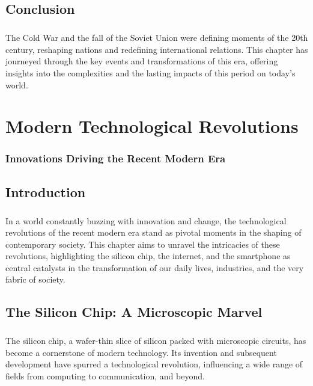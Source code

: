 \documentclass[a4paper,12pt]{book}
\begin{document}
\section*{Conclusion}
\paragraph{}
The Cold War and the fall of the Soviet Union were defining moments of the 20th century, reshaping nations and redefining international relations. This chapter has journeyed through the key events and transformations of this era, offering insights into the complexities and the lasting impacts of this period on today’s world.

\chapter{Modern Technological Revolutions}
\subsection*{Innovations Driving the Recent Modern Era}

\section*{Introduction}
\paragraph{}
In a world constantly buzzing with innovation and change, the technological revolutions of the recent modern era stand as pivotal moments in the shaping of contemporary society. This chapter aims to unravel the intricacies of these revolutions, highlighting the silicon chip, the internet, and the smartphone as central catalysts in the transformation of our daily lives, industries, and the very fabric of society.

\section*{The Silicon Chip: A Microscopic Marvel}
\paragraph{}
The silicon chip, a wafer-thin slice of silicon packed with microscopic circuits, has become a cornerstone of modern technology. Its invention and subsequent development have spurred a technological revolution, influencing a wide range of fields from computing to communication, and beyond.
\end{document}
